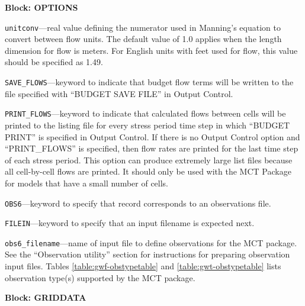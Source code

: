 
\item \textbf{Block: OPTIONS}

\begin{description}
\item \texttt{unitconv}---real value defining the numerator used in Manning's equation to convert between flow units.  The default value of 1.0 applies when the length dimension for flow is meters.  For English units with feet used for flow, this value should be specified as 1.49.

\item \texttt{SAVE\_FLOWS}---keyword to indicate that budget flow terms will be written to the file specified with ``BUDGET SAVE FILE'' in Output Control.

\item \texttt{PRINT\_FLOWS}---keyword to indicate that calculated flows between cells will be printed to the listing file for every stress period time step in which ``BUDGET PRINT'' is specified in Output Control. If there is no Output Control option and ``PRINT\_FLOWS'' is specified, then flow rates are printed for the last time step of each stress period.  This option can produce extremely large list files because all cell-by-cell flows are printed.  It should only be used with the MCT Package for models that have a small number of cells.

\item \texttt{OBS6}---keyword to specify that record corresponds to an observations file.

\item \texttt{FILEIN}---keyword to specify that an input filename is expected next.

\item \texttt{obs6\_filename}---name of input file to define observations for the MCT package. See the ``Observation utility'' section for instructions for preparing observation input files. Tables \ref{table:gwf-obstypetable} and \ref{table:gwt-obstypetable} lists observation type(s) supported by the MCT package.

\end{description}
\item \textbf{Block: GRIDDATA}

